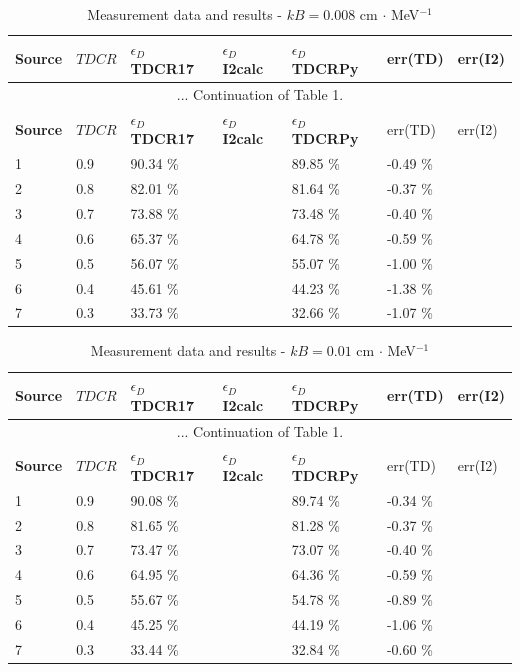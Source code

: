 \documentclass[12pt]{iopart}
\begin{document}
\begingroup
\footnotesize
\begin{longtable}[l]{| p{} | p{} |p{} |p{} |p{} |p{} |p{} |} 
\caption{Measurement data and results - $kB = 0.008$ cm $\cdot$ MeV$^{-1}$}
\label{Table1} \\ 
\hline
\textbf{Source} & \textbf{$TDCR$} & \textbf{$\epsilon_{D}$ TDCR17} & \textbf{$\epsilon_{D}$ I2calc} & \textbf{$\epsilon_{D}$ TDCRPy} & err(TD)& err(I2) \\
\endfirsthead
\multicolumn{7}{c}{... Continuation of Table 1.}\\ 
\hline
 \textbf{Source} & \textbf{$TDCR$} & \textbf{$\epsilon_{D}$ TDCR17} & \textbf{$\epsilon_{D}$ I2calc} & \textbf{$\epsilon_{D}$ TDCRPy} & err(TD)& err(I2) \\   \hline 
\endhead
\hline
 1 & 0.9   &   90.34 \% &  &  89.85 \% &  -0.49 \% & \\
 2 & 0.8   &   82.01 \% &  &  81.64 \% &  -0.37 \% & \\
 3 & 0.7   &   73.88 \% &  &  73.48 \% &  -0.40 \% & \\
 4 & 0.6   &   65.37 \% &  &  64.78 \% &  -0.59 \% & \\
 5 & 0.5   &   56.07 \% &  &  55.07 \% &  -1.00 \% & \\
 6 & 0.4   &   45.61 \% &  &  44.23 \% &  -1.38 \% & \\
 7 & 0.3   &   33.73 \% &  &  32.66 \% &  -1.07 \% & \\
\hline
\end{longtable} 
\endgroup


\begingroup
\footnotesize
\begin{longtable}[l]{| p{} | p{} |p{} | p{} |p{} |p{} |p{} |} 
\caption{Measurement data and results - $kB = 0.01$ cm $\cdot$ MeV$^{-1}$}
\label{Table1} \\ 
\hline
\textbf{Source} & \textbf{$TDCR$} & \textbf{$\epsilon_{D}$ TDCR17} & \textbf{$\epsilon_{D}$ I2calc} & \textbf{$\epsilon_{D}$ TDCRPy} & err(TD)& err(I2) \\ 
\endfirsthead
\multicolumn{7}{c}{... Continuation of Table 1.}\\ 
\hline
 \textbf{Source} & \textbf{$TDCR$} & \textbf{$\epsilon_{D}$ TDCR17} & \textbf{$\epsilon_{D}$ I2calc} & \textbf{$\epsilon_{D}$ TDCRPy} & err(TD)& err(I2) \\   \hline 
\endhead
\hline
 1 &  0.9  &  90.08 \% &  & 89.74 \% &  -0.34 \% & \\
 2 &  0.8  &  81.65 \% &  & 81.28 \% &  -0.37 \% & \\
 3 &  0.7  &  73.47 \% &  & 73.07 \% &  -0.40 \% & \\
 4 &  0.6  &  64.95 \% &  & 64.36 \% &  -0.59 \% & \\
 5 &  0.5  &  55.67 \% &  & 54.78 \% &  -0.89 \% & \\
 6 &  0.4  &  45.25 \% &  & 44.19 \% &  -1.06 \% & \\
 7 &  0.3  &  33.44 \% &  & 32.84 \% &  -0.60 \% & \\
\hline
\end{longtable} 
\endgroup
\end{document}
